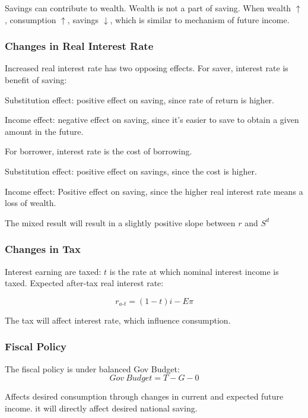 \documentclass[10pt, a4paper]{article}
\begin{document}
                    Savings can contribute to wealth. Wealth is not a part of saving. When wealth $\uparrow$, consumption $\uparrow$, savings $\downarrow$, which is similar to mechanism of future income.
                \subsubsection{Changes in Real Interest Rate} 
                    Increased real interest rate has two opposing effects. For saver, interest rate is benefit of saving: 
                    
                    \quad Substitution effect: positive effect on saving, since rate of return is higher. 

                    \quad Income effect: negative effect on saving, since it's easier to save to obtain a given amount in the future.\newline
                    
                    
                    For borrower, interest rate is the cost of borrowing.

                    \quad Substitution effect: positive effect on savings, since the cost is higher. 

                    \quad Income effect: Positive effect on saving, since the higher real interest rate means a loss of wealth.

                    The mixed result will result in a slightly positive slope between $r$ and $S^d$ 
                \subsubsection{Changes in Tax}
                    Interest earning are taxed: $t$ is the rate at which nominal interest income is taxed. Expected after-tax real interest rate: 

                    $$r_{a\text{-}t} = (1 - t)i - E\pi$$

                    The tax will affect interest rate, which influence consumption.
                \subsubsection{Fiscal Policy}

                    The fiscal policy is under balanced Gov Budget:
                    $$Gov\ Budget = T - G - 0$$

                    Affects desired consumption through changes in current and expected future income. it will directly affect desired national saving. 
                    
\end{document}
